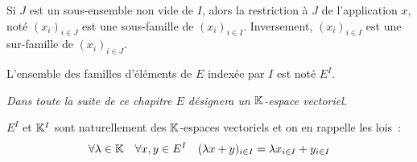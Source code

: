 Si $J$ est un sous-ensemble non vide de $I$, alors la restriction à $J$ de l'application $x$, noté $(x_i)_{i \in J}$ est une sous-famille de $(x_i)_{i \in I}$. Inversement, $(x_i)_{i \in I}$ est une sur-famille de $(x_i)_{i \in J}$.

L'ensemble des familles d'éléments de $E$ indexée par $I$ est noté $E^I$.

\emph{Dans toute la suite de ce chapitre $E$ désignera un $\mathbb{K}$-espace vectoriel.}

$E^I$ et $\mathbb{K}^I$ sont naturellement des $\mathbb{K}$-espaces vectoriels et on en rappelle les lois~:
\begin{align}
	\forall \lambda \in \K \quad \forall x,y \in E^I \quad (\lambda x +y)_{i \in I} = \lambda x_{i\in I} + y_{i\in I}
	
\end{align}